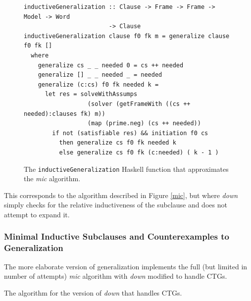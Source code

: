 \documentclass[12pt,a4paper,twoside,openright]{report}
\begin{document}
{\begin{figure}[t]
\centering
\begin{lstlisting}
inductiveGeneralization :: Clause -> Frame -> Frame -> Model -> Word
                        -> Clause
inductiveGeneralization clause f0 fk m = generalize clause f0 fk []
  where
    generalize cs _ _ needed 0 = cs ++ needed
    generalize [] _ _ needed _ = needed
    generalize (c:cs) f0 fk needed k = 
      let res = solveWithAssumps
                  (solver (getFrameWith ((cs ++ needed):clauses fk) m))
                  (map (prime.neg) (cs ++ needed))
        if not (satisfiable res) && initiation f0 cs
          then generalize cs f0 fk needed k
          else generalize cs f0 fk (c:needed) ( k - 1 ) 
\end{lstlisting}
\caption{The {\tt inductiveGeneralization} Haskell function that approximates the {\it mic} algorithm.}
\end{figure}

This corresponds to the algorithm described in Figure \ref{mic}, but where {\it down} simply
checks for the relative inductiveness of the subclause and does not attempt to expand it.

\subsubsection{Minimal Inductive Subclauses and Counterexamples to Generalization}
The more elaborate version of generalization implements the full
(but limited in number of attempts) {\it mic} algorithm with {\it down} modified
to handle CTGs.

\begin{algorithm}[t]
\DontPrintSemicolon
{}
\caption{The algorithm for the version of {\it down} that handles CTGs.}
\label{mic}
\end{algorithm}

}
\end{document}
